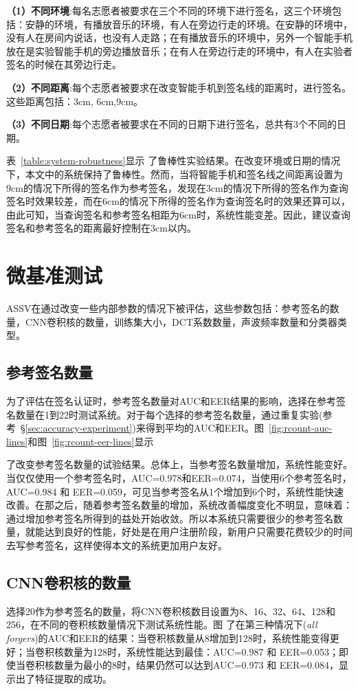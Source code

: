 \textbf{（1）不同环境}:每名志愿者被要求在三个不同的环境下进行签名，这三个环境包括：安静的环境，有播放音乐的环境，有人在旁边行走的环境。在安静的环境中，没有人在房间内说话，也没有人走路；在有播放音乐的环境中，另外一个智能手机放在是实验智能手机的旁边播放音乐；在有人在旁边行走的环境中，有人在实验者签名的时候在其旁边行走。

\textbf{（2）不同距离}:每个志愿者被要求在改变智能手机到签名线的距离时，进行签名。这些距离包括：3cm, 6cm,9cm。

\textbf{（3）不同日期}:每个志愿者被要求在不同的日期下进行签名，总共有3个不同的日期。


表~\ref{table:system-robustness}显示
了鲁棒性实验结果。在改变环境或日期的情况下，本文中的系统保持了鲁棒性。然而，当将智能手机和签名线之间距离设置为9cm的情况下所得的签名作为参考签名，发现在3cm的情况下所得的签名作为查询签名时效果较差，而在6cm的情况下所得的签名作为查询签名时的效果还算可以，由此可知，当查询签名和参考签名相距为6cm时，系统性能变差。因此，建议查询签名和参考签名的距离最好控制在3cm以内。


\section{微基准测试}
ASSV在通过改变一些内部参数的情况下被评估，这些参数包括：参考签名的数量，CNN卷积核的数量，训练集大小，DCT系数数量，声波频率数量和分类器类型。

\subsection{参考签名数量}
为了评估在签名认证时，参考签名数量对AUC和EER结果的影响，选择在参考签名数量在1到22时测试系统。对于每个选择的参考签名数量，通过重复实验(参考~\S\ref{sec:accuracy-experiment})来得到平均的AUC和EER。图~\ref{fig:rcount-auc-lines}和图~\ref{fig:rcount-eer-lines}显示

了改变参考签名数量的试验结果。总体上，当参考签名数量增加，系统性能变好。当仅仅使用一个参考签名时，AUC=0.978和EER=0.074，当使用6个参考签名时，AUC=0.984 和 EER=0.059，可见当参考签名从1个增加到6个时，系统性能快速改善。在那之后，随着参考签名数量的增加，系统改善幅度变化不明显，意味着：通过增加参考签名所得到的益处开始收敛。所以本系统只需要很少的参考签名数量，就能达到良好的性能，好处是在用户注册阶段，新用户只需要花费较少的时间去写参考签名，这样使得本文的系统更加用户友好。


\subsection{CNN卷积核的数量}
选择20作为参考签名的数量，将CNN卷积核数目设置为8、16、32、64、128和256，在不同的卷积核数量情况下测试系统性能。图
了在第三种情况下(\textit{all forgers})的AUC和EER的结果：当卷积核数量从8增加到128时，系统性能变得更好；当卷积核数量为128时，系统性能达到最佳：AUC=0.987 和 EER=0.053；即使当卷积核数量为最小的8时，结果仍然可以达到AUC=0.973 和 EER=0.084，显示出了特征提取的成功。 

